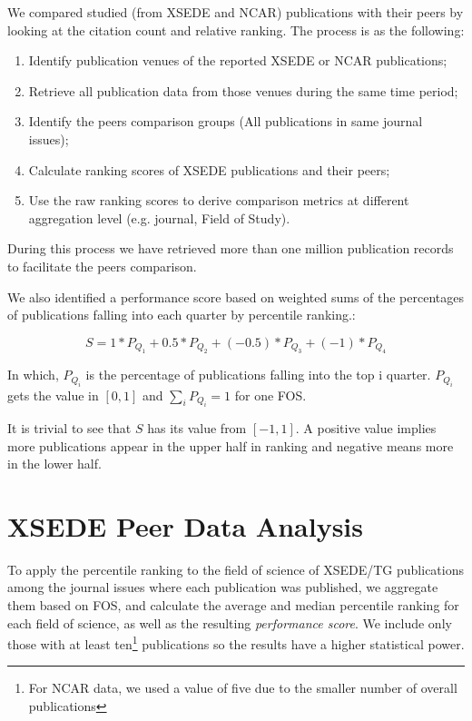 \documentclass[10pt, conference, compsocconf]{IEEEtran}
\begin{document}
We compared studied (from XSEDE and NCAR) publications with their peers by looking at the citation count and relative ranking. The process is as the following:
\begin{enumerate}
\item Identify publication venues of the reported XSEDE or NCAR publications;
\item Retrieve all publication data from those venues during the same time period;
\item Identify the peers comparison groups (All publications in same journal issues);
\item Calculate ranking scores of XSEDE publications and their peers;
\item Use the raw ranking scores to derive comparison metrics at different aggregation level (e.g. journal, Field of Study).
\end{enumerate}

During this process we have retrieved more than one million publication records to facilitate the peers comparison.

We also identified a performance score based on weighted sums of the percentages of publications falling into each quarter by percentile ranking.:

\[	S = 1*P_{Q_1} + 0.5*P_{Q_2}+ (-0.5)*P_{Q_3} + (-1)*P_{Q_4} \]

In which, $P_{Q_i}$ is the percentage of publications falling into the top i quarter. $P_{Q_i}$ gets the value in $[0,1]$ and $\sum_{i} {P_{Q_i}} = 1$ for one FOS.

It is trivial to see that $S$ has its value from $[-1, 1]$. A positive value implies more publications appear in the upper half in ranking and negative means more in the lower half.

\section{XSEDE Peer Data Analysis}
\label{S:xsede}

To apply the percentile ranking to the field of science of XSEDE/TG publications among the journal issues where each publication was published, we aggregate them based on FOS, and calculate the average and median percentile ranking for each field of science, as well as the resulting  \emph{performance score}. We include only those with at least ten\footnote{For NCAR data, we used a value of five due to the smaller number of overall publications} publications so the results have a higher statistical power. 
\end{document}
